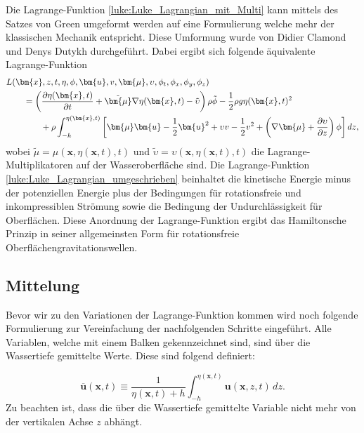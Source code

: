 Die Lagrange-Funktion \eqref{luke:Luke_Lagrangian_mit_Multi} kann mittels des Satzes von Green umgeformt werden auf eine Formulierung welche mehr der klassischen Mechanik entspricht.
Diese Umformung wurde von Didier Clamond und Denys Dutykh \cite{luke:CLAMOND201225} durchgeführt. Dabei ergibt sich folgende äquivalente Lagrange-Funktion
\begin{align}
&L(\bm{x},z,t,\eta,\phi,\bm{u}, v, \bm{\mu},\upsilon,\phi_t,\phi_x,\phi_y,\phi_z)
\notag
\\
&\qquad=
\left(\frac{\partial \eta(\bm{x},t)}{\partial t}
+
\tilde{\bm{\mu}} \nabla \eta(\bm{x},t)
-
\tilde{\upsilon}\right) \rho\tilde{\phi}
-
\frac{1}{2} \rho g \eta(\bm{x},t)^2
\notag
\\
&\qquad\qquad
	+
	\rho
	\int_{-h}^{\eta(\bm{x},t)} \left[ \bm{\mu}  \bm{u} - \frac{1}{2} \bm{u}^2 + \upsilon v - \frac{1}{2} v^2 + \left(\nabla \bm{\mu} + \frac{\partial \upsilon}{\partial z}\right) \phi \right] dz,
	\label{luke:Luke_Lagrangian_umgeschrieben}
\end{align}
wobei $\tilde{\mu} = \mu(\bm{x},\eta(\bm{x},t),t)$ und $\tilde{\upsilon} = \upsilon(\bm{x},\eta(\bm{x},t),t)$ die Lagrange-Multiplikatoren auf der Wasseroberfläche sind.
Die Lagrange-Funktion \eqref{luke:Luke_Lagrangian_umgeschrieben} beinhaltet die kinetische Energie minus der potenziellen Energie plus der Bedingungen für rotationsfreie und inkompressiblen Strömung sowie die Bedingung der Undurchlässigkeit für Oberflächen.
Diese Anordnung der Lagrange-Funktion ergibt das Hamiltonsche Prinzip in seiner allgemeinsten Form für rotationsfreie Oberflächengravitationswellen.

\subsection{Mittelung}
Bevor wir zu den Variationen der Lagrange-Funktion kommen wird noch folgende Formulierung zur Vereinfachung der nachfolgenden Schritte eingeführt.
Alle Variablen, welche mit einem Balken gekennzeichnet sind, sind über die Wassertiefe gemittelte Werte. Diese sind folgend definiert:

\begin{equation}
	\overline{\bm{u}}(\bm{x}, t) \equiv \frac{1}{\eta(\bm{x}, t) + h} \int_{-h}^{\eta(\bm{x},t)} \bm{u}(\bm{x},z,t) \, dz.
	\label{luke:Mittelung_Wassertiefe}
\end{equation}
Zu beachten ist, dass die über die Wassertiefe gemittelte Variable nicht mehr von der vertikalen Achse $z$ abhängt.

